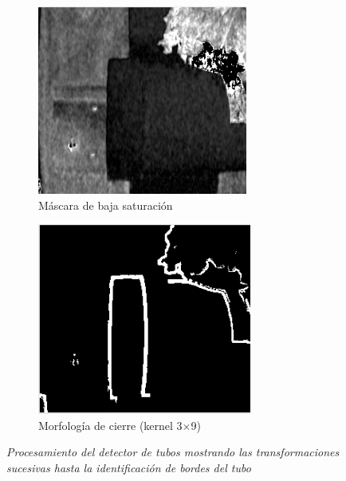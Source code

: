 \begin{figure}[H]
\begin{subfigure}[b]{0.48\textwidth}
    \centering
    \includegraphics[width=\textwidth]{imagenes/detector_tubos_3_canal_s.png}
    \caption{Máscara de baja saturación}
\end{subfigure}
\hfill
\begin{subfigure}[b]{0.48\textwidth}
    \centering
    \includegraphics[width=\textwidth]{imagenes/detector_tubos_5_morfologia.png}
    \caption{Morfología de cierre (kernel 3×9)}
\end{subfigure}

\vspace{0.3cm}

\caption{\textit{Procesamiento del detector de tubos mostrando las transformaciones sucesivas hasta la identificación de bordes del tubo}}
\label{fig:proceso_tubos}
\end{figure}

